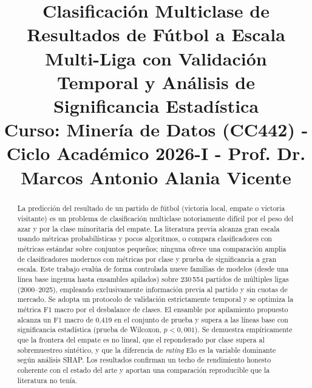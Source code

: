 \documentclass[conference]{IEEEtran}
\begin{document}
\title{Clasificaci\'on Multiclase de Resultados de F\'utbol a Escala Multi-Liga
con Validaci\'on Temporal y An\'alisis de Significancia Estad\'istica\\
{\footnotesize Curso: Miner\'ia de Datos (CC442) - Ciclo Acad\'emico 2026-I -
Prof. Dr. Marcos Antonio Alania Vicente}
}

\author{
}

\maketitle

\begin{abstract}
La predicci\'on del resultado de un partido de f\'utbol (victoria local, empate o
victoria visitante) es un problema de clasificaci\'on multiclase notoriamente dif\'icil
por el peso del azar y por la clase minoritaria del empate. La literatura previa alcanza
gran escala usando m\'etricas probabil\'isticas y pocos algoritmos, o compara
clasificadores con m\'etricas est\'andar sobre conjuntos peque\~nos; ninguna ofrece una
comparaci\'on amplia de clasificadores modernos con m\'etricas por clase y prueba de
significancia a gran escala. Este trabajo eval\'ua de forma controlada nueve familias de
modelos (desde una l\'inea base ingenua hasta ensambles apilados) sobre 230\,554 partidos
de m\'ultiples ligas (2000--2025), empleando exclusivamente informaci\'on previa al
partido y sin cuotas de mercado. Se adopta un protocolo de validaci\'on estrictamente
temporal y se optimiza la m\'etrica F1 macro por el desbalance de clases. El ensamble por
apilamiento propuesto alcanza un F1 macro de 0,419 en el conjunto de prueba y supera a las
l\'ineas base con significancia estad\'istica (prueba de Wilcoxon, $p<0{,}001$). Se
demuestra emp\'iricamente que la frontera del empate es no lineal, que el reponderado por
clase supera al sobremuestreo sint\'etico, y que la diferencia de \emph{rating} Elo es la
variable dominante seg\'un an\'alisis SHAP. Los resultados confirman un techo de
rendimiento honesto coherente con el estado del arte y aportan una comparaci\'on
reproducible que la literatura no ten\'ia.
\end{abstract}
\end{document}
